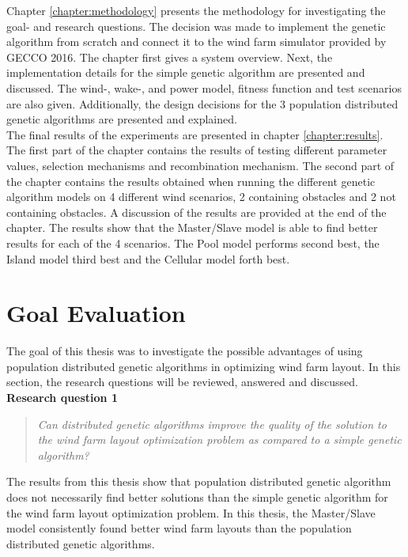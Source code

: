 \noindent Chapter \ref{chapter:methodology} presents the methodology for investigating the goal- and research questions. The decision was made to implement the genetic algorithm from scratch and connect it to the wind farm simulator provided by GECCO 2016. The chapter first gives a system overview. Next, the implementation details for the simple genetic algorithm are presented and discussed. The wind-, wake-, and power model, fitness function and test scenarios are also given. Additionally, the design decisions for the 3 population distributed genetic algorithms are presented and explained.\\


\noindent The final results of the experiments are presented in chapter \ref{chapter:results}. The first part of the chapter contains the results of testing different parameter values, selection mechanisms and recombination mechanism. The second part of the chapter contains the results obtained when running the different genetic algorithm models on 4 different wind scenarios, 2 containing obstacles and 2 not containing obstacles. A discussion of the results are provided at the end of the chapter. The results show that the Master/Slave model is able to find better results for each of the 4 scenarios. The Pool model performs second best, the Island model third best and the Cellular model forth best.\\


\section{Goal Evaluation}\label{section:goal evaluation}
\noindent The goal of this thesis was to investigate the possible advantages of using population distributed genetic algorithms in optimizing wind farm layout. In this section, the research questions will be reviewed, answered and discussed.\\

\noindent \textbf{Research question 1}

\begin{quote}
\textit{Can distributed genetic algorithms improve the quality of the solution to the wind farm layout optimization problem as compared to a simple genetic algorithm?}
\end{quote}

\noindent The results from this thesis show that population distributed genetic algorithm does not necessarily find better solutions than the simple genetic algorithm for the wind farm layout optimization problem. In this thesis, the Master/Slave model consistently found better wind farm layouts than the population distributed genetic algorithms. \\

